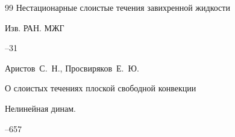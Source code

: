 \begin{thebibliography}{99}
\paper Нестационарные слоистые течения завихренной жидкости

\jour Изв. РАН. МЖГ



--31


















\by  Аристов~С.~Н.,  Просвиряков~Е.~Ю.

\paper О слоистых течениях плоской свободной конвекции

\jour Нелинейная динам.




--657




















\end{thebibliography}
